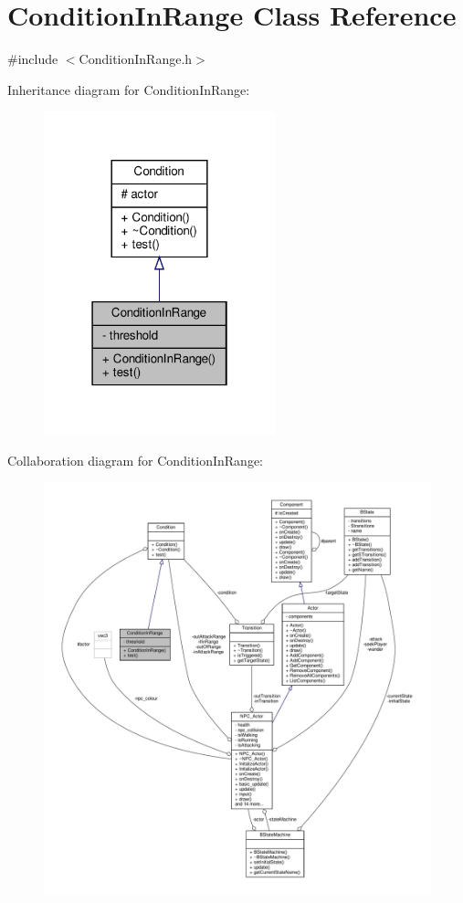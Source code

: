 \hypertarget{classConditionInRange}{}\section{Condition\+In\+Range Class Reference}
\label{classConditionInRange}


{\ttfamily \#include $<$Condition\+In\+Range.\+h$>$}



Inheritance diagram for Condition\+In\+Range\+:
\nopagebreak
\begin{figure}[H]
\begin{center}
\leavevmode
\includegraphics[width=190pt]{classConditionInRange__inherit__graph}
\end{center}
\end{figure}


Collaboration diagram for Condition\+In\+Range\+:
\nopagebreak
\begin{figure}[H]
\begin{center}
\leavevmode
\includegraphics[width=350pt]{classConditionInRange__coll__graph}
\end{center}
\end{figure}
